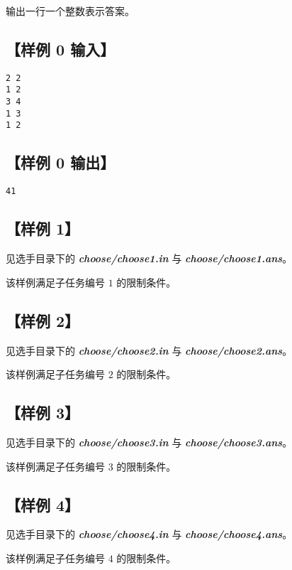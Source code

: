 \documentclass[UTF8]{ctexart}
\newcommand\file[1]{\textbf{\textit{#1}}}
\begin{document}
	输出一行一个整数表示答案。

	\subsection[样例 0 输入]{【样例 0 输入】}
	
	\begin{lstlisting}
2 2
1 2
3 4
1 3
1 2
	\end{lstlisting}
	
	\subsection[样例 0 输出]{【样例 0 输出】}
	
	\begin{lstlisting}
41
	\end{lstlisting}

	\subsection[样例 1]{【样例 1】}
	
	见选手目录下的 \file{choose/choose1.in} 与 \file{choose/choose1.ans}。
	
	该样例满足子任务编号 $1$ 的限制条件。

	\subsection[样例 2]{【样例 2】}
	
	见选手目录下的 \file{choose/choose2.in} 与 \file{choose/choose2.ans}。
	
	该样例满足子任务编号 $2$ 的限制条件。

	\subsection[样例 3]{【样例 3】}
	
	见选手目录下的 \file{choose/choose3.in} 与 \file{choose/choose3.ans}。
	
	该样例满足子任务编号 $3$ 的限制条件。

	\subsection[样例 4]{【样例 4】}
	
	见选手目录下的 \file{choose/choose4.in} 与 \file{choose/choose4.ans}。
	
	该样例满足子任务编号 $4$ 的限制条件。
\end{document}
